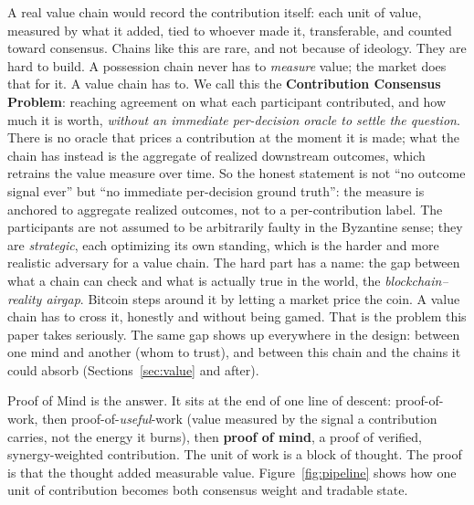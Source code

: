 \documentclass[10pt]{article}
\begin{document}
A real value chain would record the contribution itself: each unit of value, measured by what it
added, tied to whoever made it, transferable, and counted toward consensus. Chains like this are rare,
and not because of ideology. They are hard to build. A possession chain never has to \emph{measure}
value; the market does that for it. A value chain has to. We call this the \textbf{Contribution
Consensus Problem}: reaching agreement on what each participant contributed, and how much it is worth,
\emph{without an immediate per-decision oracle to settle the question}. There is no oracle that prices a
contribution at the moment it is made; what the chain has instead is the aggregate of realized
downstream outcomes, which retrains the value measure over time. So the honest statement is not ``no
outcome signal ever'' but ``no immediate per-decision ground truth'': the measure is anchored to
aggregate realized outcomes, not to a per-contribution label. The participants are not assumed to be
arbitrarily faulty in the Byzantine sense; they are
\emph{strategic}, each optimizing its own standing, which is the harder and more realistic adversary
for a value chain. The hard part has a name: the gap between
what a chain can check and what is actually true in the world, the \emph{blockchain--reality airgap}.
Bitcoin steps around it by letting a market price the coin. A value chain has to cross it, honestly and
without being gamed. That is the problem this paper takes seriously. The same gap shows up everywhere
in the design: between one mind and another (whom to trust), and between this chain and the chains it
could absorb (Sections~\ref{sec:value} and after).

Proof of Mind is the answer. It sits at the end of one line of descent: proof-of-work, then
proof-of-\emph{useful}-work (value measured by the signal a contribution carries, not the energy it
burns), then \textbf{proof of mind}, a proof of verified, synergy-weighted contribution. The unit of
work is a block of thought. The proof is that the thought added measurable value.
Figure~\ref{fig:pipeline} shows how one unit of contribution becomes both consensus weight and
tradable state.
\end{document}
